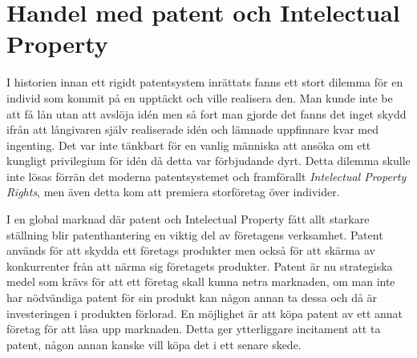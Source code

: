 \section{Handel med patent och Intelectual Property}

I historien innan ett rigidt patentsystem inrättats fanns ett stort dilemma för en individ som kommit på en upptäckt och ville realisera den. Man kunde inte be att få lån utan att avslöja idén men så fort man gjorde det fanns det inget skydd ifrån att långivaren själv realiserade idén och lämnade uppfinnare kvar med ingenting\cite{nard}. Det var inte tänkbart för en vanlig människa att ansöka om ett kungligt privilegium för idén då detta var förbjudande dyrt. Detta dilemma skulle inte lösas förrän det moderna patentsystemet och framförallt \emph{Intelectual Property Rights}, men även detta kom att premiera storföretag över individer.

I en global marknad där patent och Intelectual Property fått allt starkare ställning blir patenthantering en viktig del av företagens verksamhet. Patent används för att skydda ett företags produkter men också för att skärma av konkurrenter från att närma sig företagets produkter\cite{ove}. Patent är nu strategiska medel som krävs för att ett företag skall kunna netra marknaden, om man inte har nödvändiga patent för sin produkt kan någon annan ta dessa och då är investeringen i produkten förlorad. En möjlighet är att köpa patent av ett annat företag för att låsa upp marknaden. Detta ger ytterliggare incitament att ta patent, någon annan kanske vill köpa det i ett senare skede.